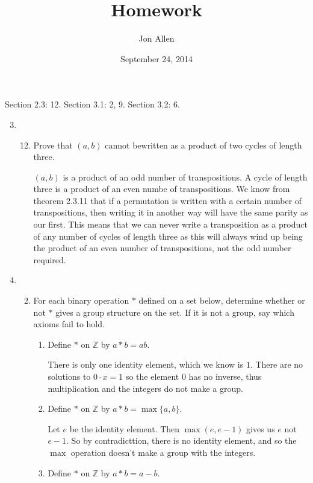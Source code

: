 \documentclass[letterpaper]{article}
\begin{document}
\title{Homework}
\date{September 24, 2014}
\author{Jon Allen}
\maketitle
Section 2.3: 12.
Section 3.1: 2, 9.
Section 3.2: 6.    
\renewcommand{\labelenumi}{2.\arabic{enumi}}
\renewcommand{\labelenumii}{\arabic{enumii}.}
\renewcommand{\labelenumiii}{(\alph{enumiii})}
\begin{enumerate}
\setcounter{enumi}{2}
\item
  \begin{enumerate}
  \setcounter{enumii}{11}
  \item
    Prove that $(a,b)$ cannot bewritten as a product of two cycles of length three.

    $(a,b)$ is a product of an odd number of transpositions. A cycle of length three is a product of an even numbe of transpositions. We know from theorem 2.3.11 that if a permutation is written with a certain number of transpositions, then writing it in another way will have the same parity as our first. This means that we can never write a transposition as a product of any number of cycles of length three as this will always wind up being the product of an even number of transpositions, not the odd number required.
  \end{enumerate}
\renewcommand{\labelenumi}{3.\arabic{enumi}}
\setcounter{enumi}{0}
\item
  \begin{enumerate}  
  \setcounter{enumii}{1}
  \item
    For each binary operation $*$ defined on a set below, determine whether or not $*$ gives a group structure on the set. If it is not a group, say which axioms fail to hold.
    \begin{enumerate}
    \item
      Define $*$ on $\mathbb{Z}$ by $a*b=ab$.

      There is only one identity element, which we know is $1$. There are no solutions to $0\cdot x=1$ so the element $0$ has no inverse, thus multiplication and the integers do not make a group.
    \item
      Define $*$ on $\mathbb{Z}$ by $a*b=\max\{a,b\}$.

      Let $e$ be the identity element. Then $\max(e,e-1)$ gives us $e$ not $e-1$. So by contradicttion, there is no identity element, and so the $\max$ operation doesn't make a group with the integers.
    \item
      Define $*$ on $\mathbb{Z}$ by $a*b=a-b$.


\end{enumerate}
\end{enumerate}
\end{enumerate}
\end{document}
